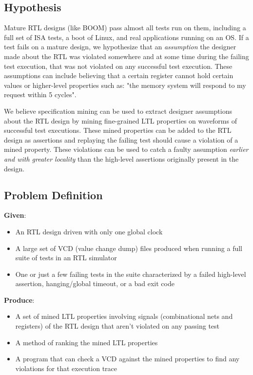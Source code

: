 \documentclass[acmlarge,11pt]{acmart}
\begin{document}
\subsection{Hypothesis}
Mature RTL designs (like BOOM) pass almost all tests run on them, including a full set of ISA tests, a boot of Linux, and real applications running on an OS.
If a test fails on a mature design, we hypothesize that an \textit{assumption} the designer made about the RTL was violated somewhere and at some time during the failing test execution, that was not violated on any successful test execution.
These assumptions can include believing that a certain register cannot hold certain values or higher-level properties such as: "the memory system will respond to my request within 5 cycles".

We believe specification mining can be used to extract designer assumptions about the RTL design by mining fine-grained LTL properties on waveforms of successful test executions.
These mined properties can be added to the RTL design as assertions and replaying the failing test should cause a violation of a mined property.
These violations can be used to catch a faulty assumption \textit{earlier and with greater locality} than the high-level assertions originally present in the design.

\subsection{Problem Definition}
\par
\textbf{Given}:
\begin{itemize}
  \item An RTL design driven with only one global clock
  \item A large set of VCD (value change dump) files produced when running a full suite of tests in an RTL simulator
  \item One or just a few failing tests in the suite characterized by a failed high-level assertion, hanging/global timeout, or a bad exit code
\end{itemize}
\textbf{Produce}:
\begin{itemize}
  \item A set of mined LTL properties involving signals (combinational nets and registers) of the RTL design that aren't violated on any passing test
  \item A method of ranking the mined LTL properties
  \item A program that can check a VCD against the mined properties to find any violations for that execution trace
\end{itemize}
\end{document}
